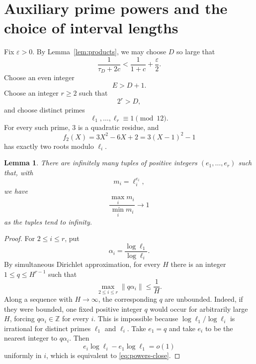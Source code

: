 \documentclass[11pt]{article}
\newtheorem{lemma}[theorem]{Lemma}
\newcommand{\Z}{\mathbb Z}
\begin{document}
\section{Auxiliary prime powers and the choice of interval lengths}

Fix $\varepsilon>0$. By Lemma~\ref{lem:products}, we may choose $D$ so large that
\begin{equation}\label{eq:D-choice}
  \frac1{\tau_D+2c}
  <\frac1{1+c}+\frac\varepsilon2.
\end{equation}
Choose an even integer
\begin{equation}\label{eq:E-choice}
  E>D+1.
\end{equation}
Choose an integer $r\geq2$ such that
\begin{equation}\label{eq:r-choice}
  2^r>D,
\end{equation}
and choose distinct primes
\[
  \ell_1,\ldots,\ell_r\equiv1\pmod{12}.
\]
For every such prime, $3$ is a quadratic residue, and
\[
  f_2(X)=3X^2-6X+2=3(X-1)^2-1
\]
has exactly two roots modulo $\ell_i$.

\begin{lemma}\label{lem:simultaneous-powers}
There are infinitely many tuples of positive integers $(e_1,\ldots,e_r)$ such that, with
\[
  m_i=\ell_i^{e_i},
\]
we have
\begin{equation}\label{eq:powers-close}
  \frac{\max_i m_i}{\min_i m_i}\longrightarrow1
\end{equation}
as the tuples tend to infinity.
\end{lemma}

\begin{proof}
For $2\leq i\leq r$, put
\[
  \alpha_i=\frac{\log\ell_1}{\log\ell_i}.
\]
By simultaneous Dirichlet approximation, for every $H$ there is an integer $1\leq q\leq H^{r-1}$ such that
\[
  \max_{2\leq i\leq r}\|q\alpha_i\|\leq\frac1H.
\]
Along a sequence with $H\to\infty$, the corresponding $q$ are unbounded. Indeed, if they were bounded, one fixed positive integer $q$ would occur for arbitrarily large $H$, forcing $q\alpha_i\in\Z$ for every $i$. This is impossible because $\log\ell_1/\log\ell_i$ is irrational for distinct primes $\ell_1$ and $\ell_i$. Take $e_1=q$ and take $e_i$ to be the nearest integer to $q\alpha_i$. Then
\[
  e_i\log\ell_i-e_1\log\ell_1=o(1)
\]
uniformly in $i$, which is equivalent to \eqref{eq:powers-close}.
\end{proof}
\end{document}
